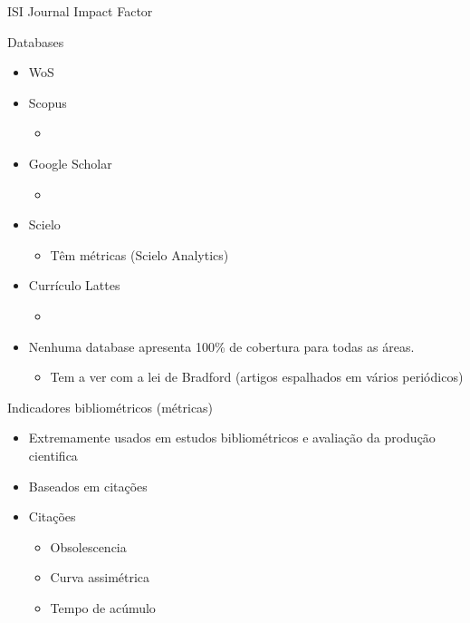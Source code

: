 \documentclass[bigger]{beamer}
\begin{document}
\begin{frame}[label={sec:orgd072457}]{ISI Journal Impact Factor}
\end{frame}



\begin{frame}[label={sec:org25e57a8}]{Databases}
\begin{itemize}
\item \alert{WoS}

\item \alert{Scopus}
\begin{itemize}
\item 
\end{itemize}

\item \alert{Google Scholar}
\begin{itemize}
\item 
\end{itemize}

\item \alert{Scielo}
\begin{itemize}
\item Têm métricas (Scielo Analytics)
\end{itemize}

\item \alert{Currículo Lattes}
\begin{itemize}
\item 
\end{itemize}

\item Nenhuma database apresenta 100\% de cobertura para todas as áreas.
\begin{itemize}
\item Tem a ver com a lei de Bradford (artigos espalhados em vários periódicos)
\end{itemize}
\end{itemize}
\end{frame}

\begin{frame}[label={sec:org9803826}]{Indicadores bibliométricos (métricas)}
\begin{itemize}
\item Extremamente usados em estudos bibliométricos e avaliação da produção cientifica
\item Baseados em citações

\item Citações
\begin{itemize}
\item Obsolescencia
\item Curva assimétrica
\item Tempo de acúmulo
\end{itemize}
\end{itemize}
\end{frame}
\end{document}

